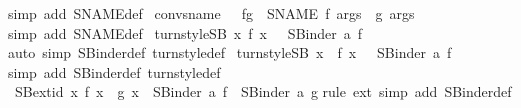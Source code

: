\begin{isabellebody}
%
\isadelimproof
%
\endisadelimproof
%
\isatagproof
{}\isamarkupfalse%
{\isacharparenleft}simp\ add{\isacharcolon}\ SNAME{}{\isacharunderscore}def{\isacharparenright}%
\endisatagproof
{\isafoldproof}%
%
\isadelimproof
\isanewline
%
\endisadelimproof
\isanewline
{}\isamarkupfalse%
\ conv{\isacharunderscore}sname\ {\isacharcolon}\ \ {\isachardoublequoteopen}f{\isasymequiv}g\ {\isasymLongrightarrow}\ SNAME\ f\ args\ {\isacharequal}\ g\ args{\isachardoublequoteclose}\isanewline
%
\isadelimproof
%
\endisadelimproof
%
\isatagproof
{}\isamarkupfalse%
{\isacharparenleft}simp\ add{\isacharcolon}\ SNAME{\isacharunderscore}def{\isacharparenright}%
\endisatagproof
{\isafoldproof}%
%
\isadelimproof
\isanewline
%
\endisadelimproof
\isanewline
{}\isamarkupfalse%
\ turnstyle{\isacharunderscore}SB{}{\isacharcolon}\ {\isachardoublequoteopen}{\isacharparenleft}{\isasymAnd}x{\isachardot}\ f\ x{\isacharparenright}\ {\isasymLongrightarrow}\ {\isacharbar}{\isacharminus}\ SBinder{}\ a\ f{\isachardoublequoteclose}\isanewline
%
\isadelimproof
%
\endisadelimproof
%
\isatagproof
{}\isamarkupfalse%
{\isacharparenleft}auto\ simp{\isacharcolon}\ SBinder{}{\isacharunderscore}def\ turnstyle{\isacharunderscore}def{\isacharparenright}%
\endisatagproof
{\isafoldproof}%
%
\isadelimproof
\isanewline
%
\endisadelimproof
\isanewline
{}\isamarkupfalse%
\ turnstyle{\isacharunderscore}SB{\isacharcolon}\ {\isachardoublequoteopen}{\isacharparenleft}{\isasymAnd}x{\isachardot}\ {\isacharbar}{\isacharminus}\ f\ x{\isacharparenright}\ {\isasymLongrightarrow}\ {\isacharbar}{\isacharminus}\ SBinder\ a\ f{\isachardoublequoteclose}\isanewline
%
\isadelimproof
%
\endisadelimproof
%
\isatagproof
{}\isamarkupfalse%
{\isacharparenleft}simp\ add{\isacharcolon}\ SBinder{\isacharunderscore}def\ turnstyle{\isacharunderscore}def{\isacharparenright}%
\endisatagproof
{\isafoldproof}%
%
\isadelimproof
\isanewline
%
\endisadelimproof
\isanewline
{}\isamarkupfalse%
\ SB{}{\isacharunderscore}ext{\isacharunderscore}id{\isacharcolon}\ {\isachardoublequoteopen}{\isacharparenleft}{\isasymAnd}x{\isachardot}\ f\ x\ {\isacharequal}\ g\ x{\isacharparenright}\ {\isasymLongrightarrow}\ SBinder{}\ a\ f\ {\isacharequal}\ SBinder{}\ a\ g{\isachardoublequoteclose}\isanewline
%
\isadelimproof
%
\endisadelimproof
%
\isatagproof
{}\isamarkupfalse%
{\isacharparenleft}rule\ ext{\isacharcomma}\ simp\ add{\isacharcolon}\ SBinder{}{\isacharunderscore}def{\isacharparenright}%

\end{isabellebody}
